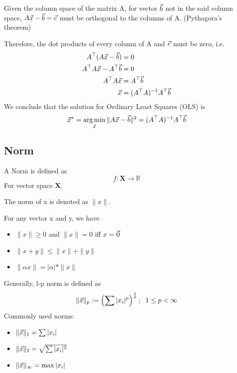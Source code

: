\begin{theorem}
	Given the column space of the matrix A, for vector $\vec{b}$ not in the said column space, $A\vec{x}-\vec{b} = \vec{e}$ must be orthogonal to the columns of A. (Pythagora's theorem)

Therefore, the dot products of every column of A and $\vec{e}$ must be zero, i.e.
	\begin{align*}
		A^\top(A\vec{x}-\vec{b}) &= 0\\
		A^\top A\vec{x}-A^\top \vec{b} &= 0\\	
		A^\top A\vec{x} &= A^\top \vec{b}\\
		\vec{x} &= (A^\top A)^{-1}A^\top \vec{b}
	\end{align*}
We conclude that the solution for Ordinary Least Squares (OLS) is
\[
\vec{x}^* = \operatorname*{arg\,min}_{\vec{x}}\|A\vec{x}-\vec{b}\|^2 = (A^\top A)^{-1}A^\top \vec{b}
\]
\end{theorem}


\subsection{Norm} %
\label{sub:norm}

\begin{definition}[Norm]
	A Norm is defined as
	\[
	f: \mathbf{X}\rightarrow\mathbb{R}
	\]
	For vector space $\mathbf{X}$.

	The norm of x is denoted as $\|x\|$.

	For any vector x and y, we have
	\begin{itemize}
		\item $\|x\|\ge0$ and $\|x\|=0$ iff $x=\vec{0}$
		\item $\|x+y\|\le\|x\|+\|y\|$
		\item $\|\alpha x\|=|\alpha|*\|x\|$
	\end{itemize}
\end{definition}

\begin{definition}[l-p Norm]
Generally, l-p norm is defined as
\[
\|\vec{x}\|_p := \left(\sum|x_i|^p\right)^{\frac{1}{p}};\;\;1\le p<\infty
\]
Commonly used norms:
\begin{itemize}
	\item $\|\vec{x}\|_1 = \sum|x_i|$
	\item $\|\vec{x}\|_2 = \sqrt{\sum|x_i|^2}$
	\item $\|\vec{x}\|_\infty = \max|x_i|$
\end{itemize}

\end{definition}

